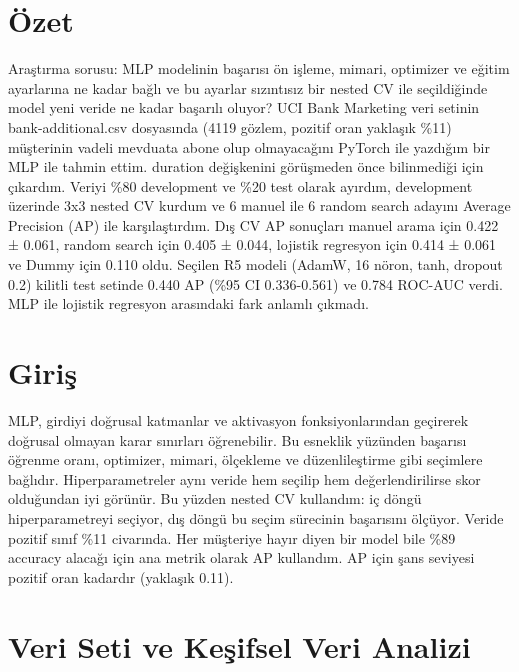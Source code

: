 \documentclass[10.5pt,a4paper]{article}
\begin{document}
\section*{Özet}
Araştırma sorusu: MLP modelinin başarısı ön işleme, mimari, optimizer ve eğitim ayarlarına ne kadar bağlı ve bu ayarlar sızıntısız bir nested CV ile seçildiğinde model yeni veride ne kadar başarılı oluyor?
UCI Bank Marketing veri setinin bank-additional.csv dosyasında (4119 gözlem, pozitif oran yaklaşık \%11) müşterinin vadeli mevduata abone olup olmayacağını PyTorch ile yazdığım bir MLP ile tahmin ettim.
duration değişkenini görüşmeden önce bilinmediği için çıkardım. Veriyi \%80 development ve \%20 test olarak ayırdım, development üzerinde 3x3 nested CV kurdum ve 6 manuel ile 6 random search adayını Average Precision (AP) ile karşılaştırdım.
Dış CV AP sonuçları manuel arama için 0.422 ± 0.061, random search için 0.405 ± 0.044, lojistik regresyon için 0.414 ± 0.061 ve Dummy için 0.110 oldu.
Seçilen R5 modeli (AdamW, 16 nöron, tanh, dropout 0.2) kilitli test setinde 0.440 AP (\%95 CI 0.336-0.561) ve 0.784 ROC-AUC verdi.
MLP ile lojistik regresyon arasındaki fark anlamlı çıkmadı.

\section{Giriş}
MLP, girdiyi doğrusal katmanlar ve aktivasyon fonksiyonlarından geçirerek doğrusal olmayan karar sınırları öğrenebilir. Bu esneklik yüzünden başarısı öğrenme oranı, optimizer, mimari, ölçekleme ve düzenlileştirme gibi seçimlere bağlıdır.
Hiperparametreler aynı veride hem seçilip hem değerlendirilirse skor olduğundan iyi görünür. Bu yüzden nested CV kullandım: iç döngü hiperparametreyi seçiyor, dış döngü bu seçim sürecinin başarısını ölçüyor.
Veride pozitif sınıf \%11 civarında. Her müşteriye hayır diyen bir model bile \%89 accuracy alacağı için ana metrik olarak AP kullandım. AP için şans seviyesi pozitif oran kadardır (yaklaşık 0.11).

\section{Veri Seti ve Keşifsel Veri Analizi}
\end{document}
